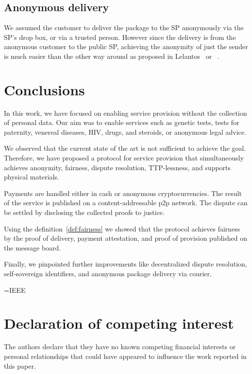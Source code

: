 \subsection{Anonymous delivery}\label{sec:anonymous-delivery}

We assumed the customer to deliver the package to the SP anonymously via the SP's drop box, or via a trusted person.
However since the delivery is from the anonymous customer to the public SP, achieving the anonymity of just the sender is much easier than the other way around as proposed in Lelantos~\cite{altawyLelantosBlockchainBasedAnonymous2017} or ~\cite{birjoveanuFairExchangeECommerce2020}.


\section{Conclusions}\label{sec:conclusion}
In this work, we have focused on enabling service provision without the collection of personal data. Our aim was to enable services such as genetic tests, tests for paternity, venereal diseases, HIV, drugs, and steroids, or anonymous legal advice.

We observed that the current state of the art is not sufficient to achieve the goal. Therefore, we have proposed a protocol for service provision that simultaneously achieves anonymity, fairness, dispute resolution, TTP-lessness, and supports physical materials.

Payments are handled either in cash or anonymous cryptocurrencies. The result of the service is published on a content-addressable p2p network. The dispute can be settled by disclosing the collected proofs to justice. 

Using the definition~\ref{def:fairness} we showed that the protocol achieves fairness by the proof of delivery, payment attestation, and proof of provision published on the message board. 

Finally, we pinpointed further improvements like decentralized dispute resolution, self-sovereign identifiers, and anonymous package delivery via courier.


\ifx\JOURNAL=IEEE

\appendices
\printbibliography
\else

\section*{Declaration of competing interest}
The authors declare that they have no known competing financial interests or personal relationships that could have appeared to influence the work reported in this paper.

